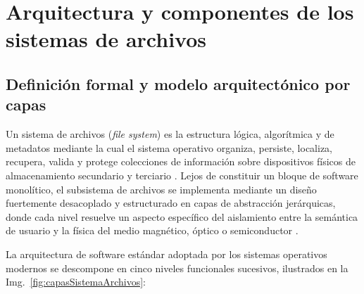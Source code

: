 \documentclass[12pt]{article}
\begin{document}
\section{Arquitectura y componentes de los sistemas de archivos}
\label{sec:arquitecturaComponentesSistemaArchivos}

\subsection{Definición formal y modelo arquitectónico por capas}
\label{subsec:definicionArquitecturaCapas}

Un sistema de archivos (\textit{file system}) es la estructura lógica, algorítmica y de metadatos mediante la cual el sistema operativo organiza, persiste, localiza, recupera, valida y protege colecciones de información sobre dispositivos físicos de almacenamiento secundario y terciario \parencite[\S 12.1, p.\ 551]{stallings2018operating}. Lejos de constituir un bloque de software monolítico, el subsistema de archivos se implementa mediante un diseño fuertemente desacoplado y estructurado en capas de abstracción jerárquicas, donde cada nivel resuelve un aspecto específico del aislamiento entre la semántica de usuario y la física del medio magnético, óptico o semiconductor \parencite[\S 11.1, p.\ 370]{silberschatz2006fundamentos}.

La arquitectura de software estándar adoptada por los sistemas operativos modernos se descompone en cinco niveles funcionales sucesivos, ilustrados en la Img.~\ref{fig:capasSistemaArchivos}:
\end{document}
